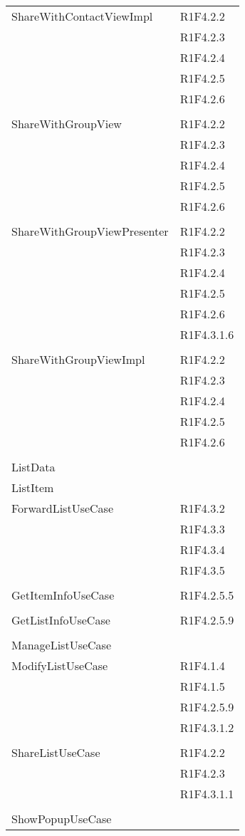 \begin{center}
\begin{longtable}{|p{7cm}|p{5cm}|}
		ShareWithContactViewImpl & R1F4.2.2 \\ & R1F4.2.3 \\ & R1F4.2.4 \\ & R1F4.2.5 \\ & R1F4.2.6 \\ & \\ \hline
		ShareWithGroupView & R1F4.2.2 \\ & R1F4.2.3 \\ & R1F4.2.4 \\ & R1F4.2.5 \\ & R1F4.2.6 \\ & \\ \hline
		ShareWithGroupViewPresenter & R1F4.2.2 \\ & R1F4.2.3 \\ & R1F4.2.4 \\ & R1F4.2.5 \\ & R1F4.2.6 \\ & R1F4.3.1.6 \\ & \\ \hline
		ShareWithGroupViewImpl & R1F4.2.2 \\ & R1F4.2.3 \\ & R1F4.2.4 \\ & R1F4.2.5 \\ & R1F4.2.6 \\ & \\ \hline
		ListData & \\ \hline
		ListItem & \\ \hline
		ForwardListUseCase & R1F4.3.2 \\ & R1F4.3.3 \\ & R1F4.3.4 \\ & R1F4.3.5 \\ & \\ \hline
		GetItemInfoUseCase & R1F4.2.5.5 \\ & \\ \hline
		GetListInfoUseCase & R1F4.2.5.9 \\ & \\ \hline
		ManageListUseCase & \\ \hline
		ModifyListUseCase & R1F4.1.4 \\ & R1F4.1.5 \\ & R1F4.2.5.9 \\ & R1F4.3.1.2 \\ & \\ \hline
		ShareListUseCase & R1F4.2.2 \\ & R1F4.2.3 \\ & R1F4.3.1.1 \\ & \\ \hline
		ShowPopupUseCase & \\ \hline
	\end{longtable}
\end{center}
